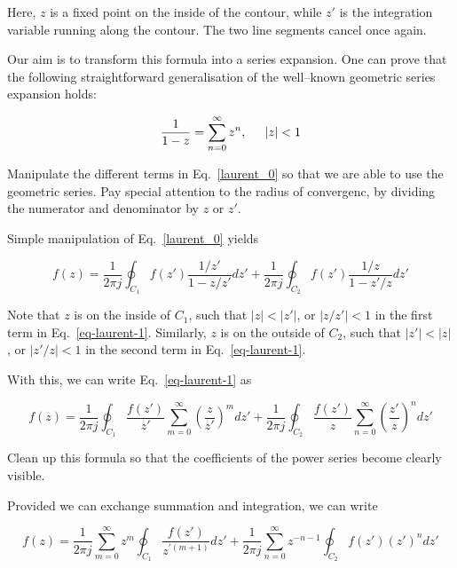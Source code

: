 Here, $z$ is a fixed point on the inside of the contour, while $z'$ is the integration variable running along the contour. The two line segments cancel once again.

Our aim is to transform this formula into a series expansion. One can prove that the following straightforward generalisation of the well--known geometric series expansion holds:

\begin{equation}
\frac{1}{1-z} = \sum_{n=0}^\infty z^n, \hspace{.5cm} |z| < 1
\end{equation}

\begin{cue}
Manipulate the different terms in Eq.~\ref{laurent_0} so that we are able to use the geometric series. Pay special attention to the radius of convergenc, by dividing the numerator and denominator by $z$ or $z'$.
\end{cue}

Simple manipulation of Eq.~\ref{laurent_0} yields

\begin{equation}
f(z)=\frac{1}{2 \pi j }\oint_{{C}_1} f(z') \frac{1 / z'} {1-z / z'} dz' + \frac{1}{2 \pi j }\oint_{{C}_2} f(z') \frac{1 / z} {1 - z' / z} dz'
\label{eq-laurent-1}
\end{equation} 

Note that $z$ is on the inside of ${C}_1$, such that $| z | < |z'| $, or $ |z / z' | < 1$ in the first term in Eq.~\ref{eq-laurent-1}. Similarly, $z$ is on the outside of ${C}_2$, such that $|z'| < | z | $, or $ |z'  / z| <
1$ in the second term in Eq.~\ref{eq-laurent-1}.

With this, we can write Eq.~\ref{eq-laurent-1} as

\begin{equation}
f(z)=\frac{1}{2 \pi j }\oint_{{C}_1} \frac{f(z')}{z'} \sum_{m=0}^{\infty} \left( \frac{z}{z'}\right)^m dz' + \frac{1}{2 \pi j }\oint_{{C}_2} \frac{f(z')}{z} \sum_{n=0}^{\infty} \left(\frac{z'}{z}\right)^n dz'
\end{equation}

\begin{cue}
Clean up this formula so that the coefficients of the power series become clearly visible.
\end{cue}

Provided we can exchange summation and integration, we can write

\begin{equation}
f(z)=\frac{1}{2 \pi j } \sum_{m=0}^{\infty} z^m \oint_{{C}_1} \frac{f(z')}{z^{\prime (m+1)}} dz' + \frac{1}{2 \pi j } \sum_{n=0}^{\infty} z ^ {-n-1} \oint_{{C}_2}  {f(z')}  (z')^ n dz'
\end{equation} 

